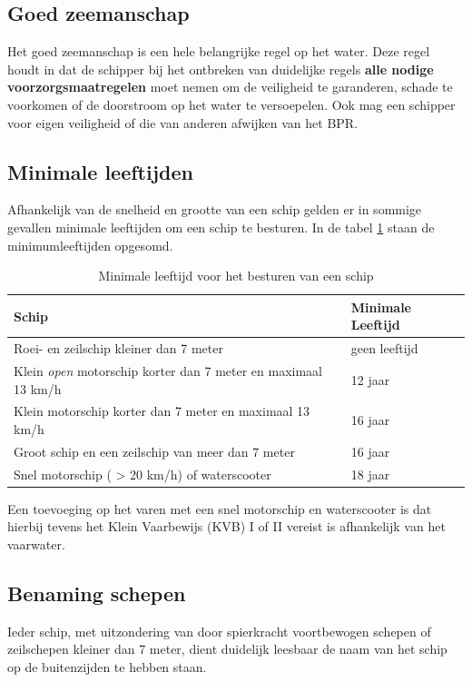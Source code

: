 \subsection{Goed zeemanschap}
Het goed zeemanschap is een hele belangrijke regel op het water. Deze regel houdt in dat de schipper bij het ontbreken van duidelijke regels \textbf{alle nodige voorzorgsmaatregelen} moet nemen om de veiligheid te garanderen, schade te voorkomen of de doorstroom op het water te versoepelen. Ook mag een schipper voor eigen veiligheid of die van anderen afwijken van het BPR.


\subsection{Minimale leeftijden}
Afhankelijk van de snelheid en grootte van een schip gelden er in sommige gevallen minimale leeftijden om een schip te besturen. In de tabel \ref{tab:leeftijd} staan de minimumleeftijden opgesomd. 

\begin{table}[h]
	\centering
	\caption{Minimale leeftijd voor het besturen van een schip}
	\label{tab:leeftijd}
	\begin{tabular}{l|l}
		\textbf{Schip} & \textbf{Minimale Leeftijd} \\ \hline
		Roei- en zeilschip kleiner dan 7 meter			& geen leeftijd \\
		Klein \textit{open} motorschip korter dan 7 meter en maximaal 13 km/h & 12 jaar \\
		Klein motorschip korter dan 7 meter en maximaal 13 km/h & 16 jaar \\
		Groot schip en een zeilschip van meer dan 7 meter & 16 jaar \\
		Snel motorschip ( > 20 km/h) of waterscooter & 18 jaar
		
	\end{tabular}
\end{table}
Een toevoeging op het varen met een snel motorschip en waterscooter is dat hierbij tevens het Klein Vaarbewijs (KVB) I of II vereist is afhankelijk van het vaarwater.

\subsection{Benaming schepen}
Ieder schip, met uitzondering van door spierkracht voortbewogen schepen of zeilschepen kleiner dan 7 meter, dient duidelijk leesbaar de naam van het schip op de buitenzijden te hebben staan.

